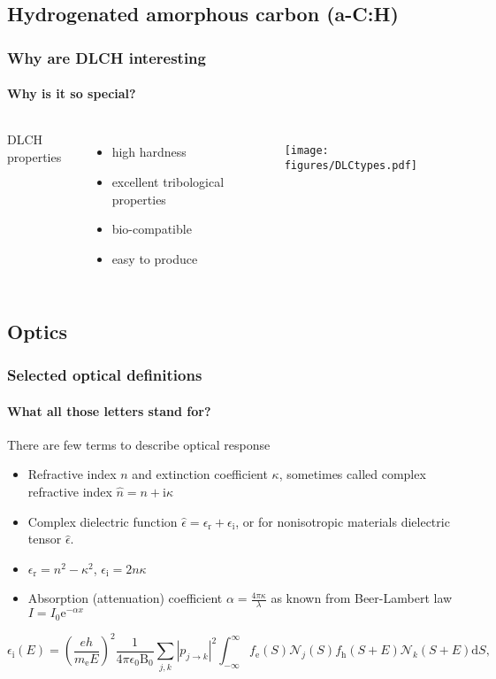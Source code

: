 \documentclass{beamer}
\begin{document}
\subsection{Hydrogenated amorphous carbon (a-C:H)}
\begin{frame}
    \frametitle{Why are DLCH interesting}
    \framesubtitle{Why is it so special?}
	\begin{columns}[c]
	DLCH properties
	\begin{itemize}
	\item high hardness
	\item excellent tribological properties
	\item bio-compatible
	\item easy to produce
	\end{itemize}

    \begin{figure}
	\texttt{[image: figures/DLCtypes.pdf]}
	\end{figure}

	\end{columns}
\end{frame}

\subsection{Optics}
\begin{frame}
    \frametitle{Selected optical definitions}
    \framesubtitle{What all those letters stand for?}

	There are few terms to describe optical response

	\begin{itemize}
	\item Refractive index $n$ and extinction coefficient $\kappa$, sometimes called complex refractive index $\hat{n} = n + \mathrm{i} \kappa$
	\item Complex dielectric function $\hat{\epsilon} = \epsilon_\mathrm{r} + \epsilon_\mathrm{i}$, or for nonisotropic materials dielectric tensor $\hat{\epsilon}$.
	\item $\epsilon_\mathrm{r} = n^2 - \kappa^2 $, $\epsilon_\mathrm{i} = 2 n \kappa$
	\item Absorption (attenuation) coefficient $\alpha = \frac{4 \pi \kappa}{\lambda}$ as known from Beer-Lambert law $I = I_0 \mathrm{e}^{-\alpha x}$  
	\end{itemize} 
	\small
	\begin{equation}	
	\epsilon_\mathrm{i} (E) = 
\left(\frac{eh}{m_\mathrm{e}E} \right)^2 \frac{1}{4 \pi \epsilon_0 \mathrm{B}_0} \sum_{j,k} | p_{j \rightarrow k} |^2
\int_{-\infty}^\infty f_\mathrm{e}(S) \mathcal{N}_j(S) f_\mathrm{h}(S+E) \mathcal{N}_k(S + E)\mathrm{d}S \text{,}
	\end{equation}
	\normalsize
\end{frame}
\end{document}
